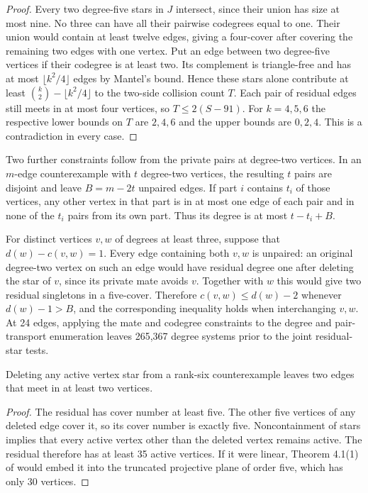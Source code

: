 \begin{proof}
Every two degree-five stars in $J$ intersect, since their union
has size at most nine. No three can have all their pairwise
codegrees equal to one. Their union would contain at least twelve
edges, giving a four-cover after covering the remaining two edges
with one vertex. Put an edge between two degree-five vertices if
their codegree is at least two. Its complement is triangle-free
and has at most $\lfloor k^2/4\rfloor$ edges by Mantel's bound.
Hence these stars alone contribute at least
$\binom k2-\lfloor k^2/4\rfloor$ to the two-side collision count $T$.
Each pair of residual edges still meets in at most four vertices,
so $T\le2(S-91)$. For $k=4,5,6$ the respective lower bounds on
$T$ are $2,4,6$ and the upper bounds are $0,2,4$.
This is a contradiction in every case.
\end{proof}

Two further constraints follow from the private pairs at degree-two
vertices. In an $m$-edge counterexample with $t$ degree-two vertices,
the resulting $t$ pairs are disjoint and leave $B=m-2t$ unpaired
edges. If part $i$ contains $t_i$ of those vertices, any other vertex
in that part is in at most one edge of each pair and in none of the
$t_i$ pairs from its own part. Thus its degree is at most $t-t_i+B$.

For distinct vertices $v,w$ of degrees at least three, suppose that
$d(w)-c(v,w)=1$. Every edge containing both $v,w$ is unpaired:
an original degree-two vertex on such an edge would have residual
degree one after deleting the star of $v$, since its private mate
avoids $v$. Together with $w$ this would give two residual
singletons in a five-cover. Therefore $c(v,w)\le d(w)-2$ whenever
$d(w)-1>B$, and the corresponding inequality holds when interchanging
$v,w$. At 24 edges, applying the mate and codegree constraints to
the degree and pair-transport enumeration leaves 265,367 degree
systems prior to the joint residual-star tests.

\begin{proposition}
Deleting any active vertex star from a rank-six counterexample leaves
two edges that meet in at least two vertices.
\end{proposition}

\begin{proof}
The residual has cover number at least five. The other five vertices
of any deleted edge cover it, so its cover number is exactly five.
Noncontainment of stars implies that every active vertex other than
the deleted vertex remains active. The residual therefore has at least
35 active vertices. If it were linear, Theorem 4.1(1) of \cite{fhmw}
would embed it into the truncated projective plane of order five,
which has only 30 vertices.
\end{proof}

